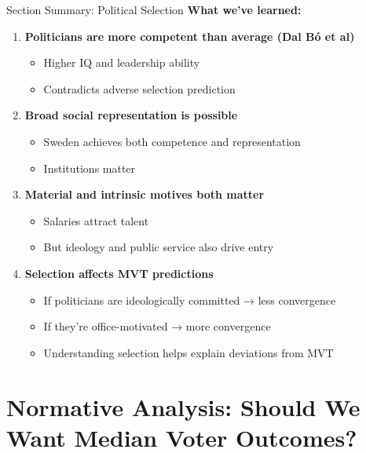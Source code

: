 \documentclass[10pt]{beamer}
\begin{document}
\begin{frame}{Section Summary: Political Selection}
\textbf{What we've learned:}

\begin{enumerate}
\item \textbf{Politicians are more competent than average (Dal Bó et al)}
\begin{itemize}
\item Higher IQ and leadership ability
\item Contradicts adverse selection prediction
\end{itemize}


\item \textbf{Broad social representation is possible}
\begin{itemize}
\item Sweden achieves both competence and representation
\item Institutions matter
\end{itemize}


\item \textbf{Material and intrinsic motives both matter}
\begin{itemize}
\item Salaries attract talent
\item But ideology and public service also drive entry
\end{itemize}


\item \textbf{Selection affects MVT predictions}
\begin{itemize}
\item If politicians are ideologically committed → less convergence
\item If they're office-motivated → more convergence
\item Understanding selection helps explain deviations from MVT
\end{itemize}
\end{enumerate}
\end{frame}

\section{Normative Analysis: Should We Want Median Voter Outcomes?}
\end{document}
